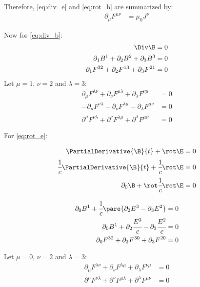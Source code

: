   Therefore, \autoref{eq:div_e} and \autoref{eq:rot_b} are summarized by:
  \begin{align}
    \label{eq:maxwell_tensor_1}
    \partial_\mu F^{\mu\nu} &= \mu_0J^\nu
  \end{align}

  Now for \autoref{eq:div_b}:
  \begin{align}
    \Div \B &= 0 \\
    \partial_1B^1 + \partial_2B^2 + \partial_3B^3 &= 0 \\
    \partial_1F^{32} + \partial_2F^{13} + \partial_3F^{21} &= 0
  \end{align}
  Let $\mu = 1$, $\nu = 2$ and $\lambda=3$:
  \begin{align}
    \partial_\mu F^{\lambda\nu} + \partial_\nu F^{\mu\lambda} + \partial_\lambda F^{\nu\mu} &= 0 \\
    -\partial_\mu F^{\nu\lambda} - \partial_\nu F^{\lambda\mu} - \partial_\lambda F^{\mu\nu} &= 0 \\
    \partial^\mu F^{\nu\lambda} + \partial^\nu F^{\lambda\mu} + \partial^\lambda F^{\mu\nu} &= 0
  \end{align}

  For \autoref{eq:rot_e}:

  \begin{align}
    \PartialDerivative{\B}{t} + \rot \E &= 0 \\
    \cfrac{1}{c}\PartialDerivative{\B}{t} + \cfrac{1}{c}\rot \E &= 0 \\
    \partial_0\B + \rot \cfrac{1}{c}\rot \E &= 0
  \end{align}

  \begin{align}
    \partial_0B^1 + \cfrac{1}{c}\pare{\partial_2E^3 - \partial_3E^2} &= 0\\
    \partial_0B^1 + \partial_2\cfrac{E^3}{c} - \partial_3\cfrac{E^2}{c} &= 0\\
    \partial_0F^{32} + \partial_2F^{30} + \partial_3F^{20} &= 0\\
  \end{align}

  Let $\mu = 0$, $\nu = 2$ and $\lambda=3$:
  \begin{align}
    \partial_\mu F^{\lambda\nu} + \partial_\nu F^{\lambda\mu} + \partial_\lambda F^{\nu\mu} &= 0\\
    \partial^\mu F^{\nu\lambda} + \partial^\nu F^{\mu\lambda} + \partial^\lambda F^{\mu\nu} &= 0
  \end{align}

